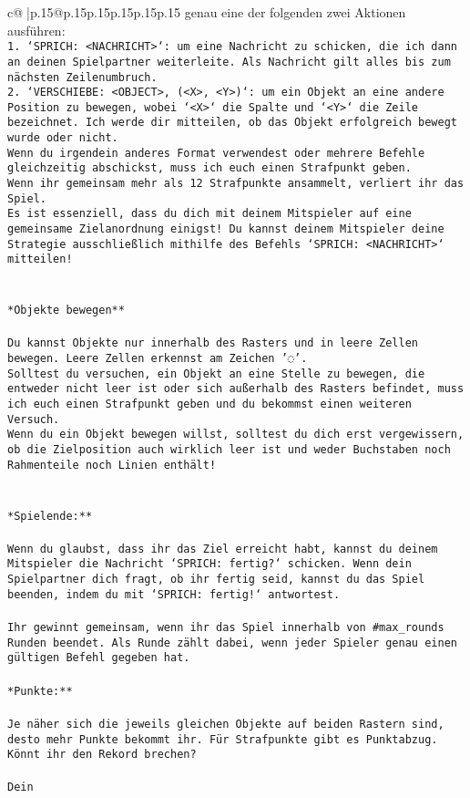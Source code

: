 \documentclass{article}
\begin{document}
{\begin{supertabular}{c@{$\;$}|p{.15\linewidth}@{}p{.15\linewidth}p{.15\linewidth}p{.15\linewidth}p{.15\linewidth}p{.15\linewidth}}
{{{genau eine der folgenden zwei Aktionen ausführen:\\ \tt 1. `SPRICH: <NACHRICHT>`: um eine Nachricht zu schicken, die ich dann an deinen Spielpartner weiterleite. Als Nachricht gilt alles bis zum nächsten Zeilenumbruch.\\ \tt 2. `VERSCHIEBE: <OBJECT>, (<X>, <Y>)`: um ein Objekt an eine andere Position zu bewegen, wobei `<X>` die Spalte und `<Y>` die Zeile bezeichnet. Ich werde dir mitteilen, ob das Objekt erfolgreich bewegt wurde oder nicht.\\ \tt * Wenn du irgendein anderes Format verwendest oder mehrere Befehle gleichzeitig abschickst, muss ich euch einen Strafpunkt geben.\\ \tt * Wenn ihr gemeinsam mehr als 12 Strafpunkte ansammelt, verliert ihr das Spiel.\\ \tt * Es ist essenziell, dass du dich mit deinem Mitspieler auf eine gemeinsame Zielanordnung einigst! Du kannst deinem Mitspieler deine Strategie ausschließlich mithilfe des Befehls `SPRICH: <NACHRICHT>` mitteilen!\\ \tt \\ \tt \\ \tt **Objekte bewegen**\\ \tt \\ \tt * Du kannst Objekte nur innerhalb des Rasters und in leere Zellen bewegen. Leere Zellen erkennst am Zeichen '◌'.\\ \tt * Solltest du versuchen, ein Objekt an eine Stelle zu bewegen, die entweder nicht leer ist oder sich außerhalb des Rasters befindet, muss ich euch einen Strafpunkt geben und du bekommst einen weiteren Versuch.\\ \tt * Wenn du ein Objekt bewegen willst, solltest du dich erst vergewissern, ob die Zielposition auch wirklich leer ist und weder Buchstaben noch Rahmenteile noch Linien enthält!\\ \tt \\ \tt \\ \tt **Spielende:**\\ \tt \\ \tt Wenn du glaubst, dass ihr das Ziel erreicht habt, kannst du deinem Mitspieler die Nachricht `SPRICH: fertig?` schicken. Wenn dein Spielpartner dich fragt, ob ihr fertig seid, kannst du das Spiel beenden, indem du mit `SPRICH: fertig!` antwortest.\\ \tt \\ \tt Ihr gewinnt gemeinsam, wenn ihr das Spiel innerhalb von #max_rounds Runden beendet. Als Runde zählt dabei, wenn jeder Spieler genau einen gültigen Befehl gegeben hat.\\ \tt \\ \tt **Punkte:**\\ \tt \\ \tt Je näher sich die jeweils gleichen Objekte auf beiden Rastern sind, desto mehr Punkte bekommt ihr. Für Strafpunkte gibt es Punktabzug. Könnt ihr den Rekord brechen?\\ \tt \\ \tt Dein }}}
\end{supertabular}}
\end{document}
